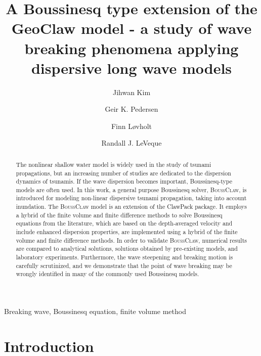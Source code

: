 \documentclass[review]{elsarticle}
\newcommand{\BoussClaw}{\textsc{BoussClaw} }
\newcommand{\BoussClawt}{\textsc{BoussClaw}}
\begin{document}
\begin{frontmatter}

\title{A Boussinesq type extension of  the GeoClaw model - a study of wave breaking phenomena applying dispersive long wave models}

\author[1]{Jihwan Kim}
\author[1]{Geir K. Pedersen}
\author[1,2]{Finn L{\o}vholt}
\author[3]{Randall J. LeVeque}

\address[1]{University of Oslo, Department of Mathematics, 
Oslo, Norway}
\address[2]{Norwegian Geotechnical Institute,
Oslo, Norway}
\address[3]{University of Washington, Department of Applied Mathematics, Seattle, USA}

\begin{abstract}

The nonlinear shallow water model is widely used
in the study of tsunami propagations,
but an increasing number of studies 
are dedicated to the dispersion dynamics of tsunamis.
If the wave dispersion becomes important,
Boussinesq-type models are often used. 
In this work, a general purpose Boussinesq solver, 
\BoussClawt, is introduced
for modeling non-linear dispersive tsunami propagation, 
taking into account inundation. 
The \BoussClaw model is an extension of the ClawPack package.
It employs a hybrid of the finite volume
and finite difference methods to solve
Boussinesq equations from the literature, which are 
based on the depth-averaged velocity 
and include enhanced dispersion properties, 
are implemented using a hybrid of the finite volume
and finite difference methods.
In order to validate \BoussClawt, 
numerical results are compared 
to  analytical solutions, solutions obtained by pre-existing models, and laboratory experiments. 
Furthermore, the  wave steepening and breaking motion
is carefully scrutinized, 
and we demonstrate that the point of wave breaking
may be wrongly identified  in many of the commonly used Boussinesq models. 

\end{abstract}

\begin{keyword}
Breaking wave, Boussinesq equation, finite volume method
\end{keyword}

\end{frontmatter}

\linenumbers

\section{Introduction}
\end{document}

